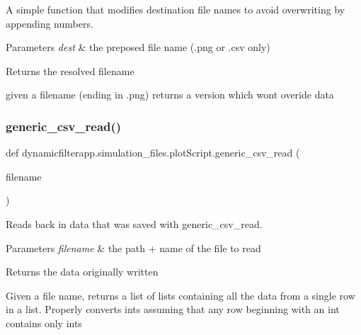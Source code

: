 A simple function that modifies destination file names to avoid overwriting by appending numbers. 


\begin{DoxyParams}{Parameters}
{\em dest} & the preposed file name (.png or .csv only) \\
\hline
\end{DoxyParams}
\begin{DoxyReturn}{Returns}
the resolved filename \begin{DoxyVerb}given a filename (ending in .png) returns a version which wont overide data
\end{DoxyVerb}
 
\end{DoxyReturn}
\mbox{\label{namespacedynamicfilterapp_1_1simulation__files_1_1plot_script_a471203f34a5e5a8da0a8dae81ef6ddc7}} 
\subsubsection{\texorpdfstring{generic\_csv\_read()}{generic\_csv\_read()}}
{\footnotesize\ttfamily def dynamicfilterapp.\+simulation\+\_\+files.\+plot\+Script.\+generic\+\_\+csv\+\_\+read (\begin{DoxyParamCaption}\item[{}]{filename }\end{DoxyParamCaption})}



Reads back in data that was saved with generic\+\_\+csv\+\_\+read. 


\begin{DoxyParams}{Parameters}
{\em filename} & the path + name of the file to read \\
\hline
\end{DoxyParams}
\begin{DoxyReturn}{Returns}
the data originally written \begin{DoxyVerb}Given a file name, returns a list of lists containing all the data from a
single row in a list. Properly converts ints assuming that any row beginning
with an int contains only ints
\end{DoxyVerb}
 
\end{DoxyReturn}
\mbox{\label{namespacedynamicfilterapp_1_1simulation__files_1_1plot_script_afc50b7236c9fe752b68c9fe393c26230}} 
